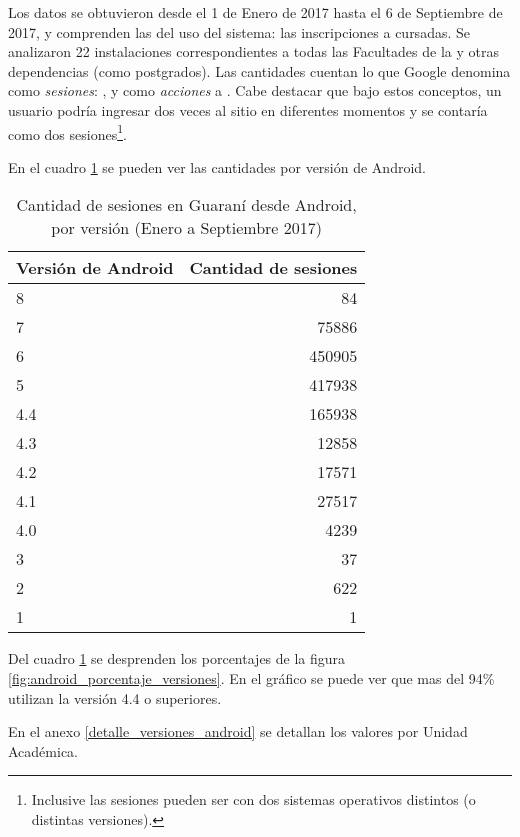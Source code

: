 Los datos se obtuvieron desde el 1 de Enero de 2017 hasta el 6 de Septiembre de 2017, y comprenden las  del uso del sistema: las inscripciones a cursadas. Se analizaron 22 instalaciones correspondientes a todas las Facultades de la \unlp{} y otras dependencias (como postgrados).
Las cantidades cuentan lo que Google denomina como \textit{sesiones}: , y como \textit{acciones} a \cite{google2017analyticsSesion}.
Cabe destacar que bajo estos conceptos, un usuario podría ingresar dos veces al sitio en diferentes momentos y se contaría como dos sesiones\footnote{Inclusive las sesiones pueden ser con dos sistemas operativos distintos (o distintas versiones).}. 

En el cuadro \ref{android_versiones_cantidad} se pueden ver las cantidades por versión de Android.

\begin{table}[htbp]
\centering
\caption{Cantidad de sesiones en Guaraní desde Android, por versión (Enero a Septiembre 2017)}
\label{android_versiones_cantidad}
\begin{tabular}{|l|r|}
\hline
\textbf{Versión de Android} & \multicolumn{1}{l|}{\textbf{Cantidad de sesiones}} \\ \hline
8   & 84     \\ \hline
7   & 75886  \\ \hline
6   & 450905 \\ \hline
5   & 417938 \\ \hline
4.4 & 165938 \\ \hline
4.3 & 12858  \\ \hline
4.2 & 17571  \\ \hline
4.1 & 27517  \\ \hline
4.0 & 4239   \\ \hline
3   & 37     \\ \hline
2   & 622    \\ \hline
1   & 1     \\ \hline
\end{tabular}
\end{table}

Del cuadro \ref{android_versiones_cantidad} se desprenden los porcentajes de la figura \ref{fig:android_porcentaje_versiones}. En el gráfico se puede ver que mas del 94\% utilizan la versión 4.4 o superiores.


En el anexo \ref{detalle_versiones_android} se detallan los valores por Unidad Académica.